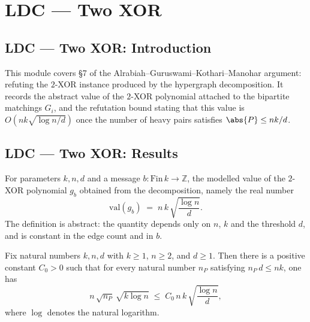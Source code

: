 \section{LDC --- Two XOR}
\subsection*{LDC --- Two XOR: Introduction}

This module covers \S7 of the Alrabiah--Guruswami--Kothari--Manohar argument: refuting
the $2$-XOR instance produced by the hypergraph decomposition. It records the abstract
value of the $2$-XOR polynomial attached to the bipartite matchings $G_i$, and the
refutation bound stating that this value is $O\!\left(n k \sqrt{\log n / d}\right)$ once
the number of heavy pairs satisfies $\abs{P} \le nk/d$.

\subsection*{LDC --- Two XOR: Results}

\begin{definition}
\label{twoXORVal}
\leanok
{}
For parameters $k, n, d$ and a message $b : \mathrm{Fin}\,k \to \mathbb{Z}$, the modelled
value of the $2$-XOR polynomial $g_b$ obtained from the decomposition, namely the real
number
\[
  \mathrm{val}(g_b) \;=\; n \, k \, \sqrt{\frac{\log n}{d}} .
\]
The definition is abstract: the quantity depends only on $n$, $k$ and the threshold $d$,
and is constant in the edge count and in $b$.
\end{definition}

\begin{theorem}
\label{two_xor_refutation}
\leanok
{}
Fix natural numbers $k, n, d$ with $k \ge 1$, $n \ge 2$, and $d \ge 1$. Then there is a
positive constant $C_0 > 0$ such that for every natural number $n_P$ satisfying $n_P\, d
\le n k$, one has
\[
  n \, \sqrt{n_P} \, \sqrt{k \log n}
    \;\le\; C_0 \, n \, k \, \sqrt{\frac{\log n}{d}} ,
\]
where $\log$ denotes the natural logarithm.
\end{theorem}
